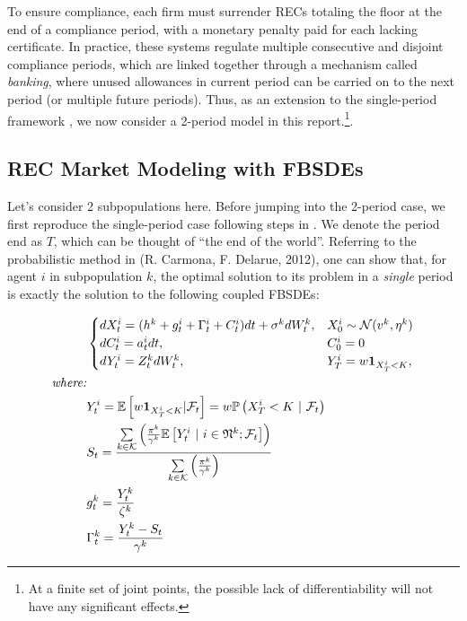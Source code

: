 \documentclass[a4paper,10pt]{article}
\newcommand{\1}{\mathbf{1}}
\begin{document}
To ensure compliance, each firm must surrender RECs totaling the floor
at the end of a compliance period, with a monetary penalty paid for each
lacking certificate. In practice, these systems regulate multiple
consecutive and disjoint compliance periods, which are linked together
through a mechanism called \emph{banking}, where unused allowances in
current period can be carried on to the next period (or multiple future
periods). Thus, as an extension to the single-period framework \cite{SC}, we
now consider a 2-period model in this report.\footnote{At a finite set
  of joint points, the possible lack of differentiability will not have
  any significant effects.}.

\subsection{REC Market Modeling with
FBSDEs}\label{rec-market-modeling}



Let's consider 2 subpopulations here. Before jumping into the 2-period
case, we first reproduce the single-period case following steps in \cite{SC}. We
denote the period end as \(T\), which can be thought of ``the end of the
world''. Referring to the probabilistic method in \cite{RC} (R. Carmona, F. Delarue,
2012), one can show that, for agent \(i\) in subpopulation \(k\), the
optimal solution to its problem in a \emph{single} period is exactly the
solution to the following coupled FBSDEs:

\begin{alignat}{2}
    &\begin{cases}
        dX_t^{i} = (h^{k} + g_t^{i} + \Gamma_t^{i} + C_t^{i})dt + \sigma^{k}dW_t^{k},  &X_0^{i} \sim \mathcal{N}(v^k,\eta^k) \notag \\
        dC_t^{i} = a_t^{i}dt, &C_0^{i}=0 \notag \\
        dY_t^{i} = Z_t^{k}dW_t^{k}, &Y_{T}^{i} = w\mathbf{1}_{X_{T}^i<K}, \notag \\
    \end{cases}\\
    \textit{where:}&\\
        &Y_t^i = \mathbb{E} \left[w\mathbf{1}_{X_{T}^i< K}|\mathcal{F}_t \right] = w\mathbb{P}\left(X_{T}^i< K ~|~ \mathcal {F}_t\right) \notag \\
        &S_t = \frac{\sum\limits_{k \in \mathcal{K}} {\left(\frac{\pi^k}{\gamma^k}\mathbb{E}\left[ Y_t^i ~|~ i \in \mathfrak{N}^k; \mathcal{F}_t \right]\right)} }{\sum\limits_{k \in \mathcal{K}}{\left(\frac{\pi^k}{\gamma^k}\right)}} \notag \\
        &g_t^k = \frac{Y_t^k}{\zeta^k} \notag \\
        &\Gamma_t^{k} = \frac{Y_t^{k}-S_t}{\gamma^{k}} 
\end{alignat}
\end{document}
